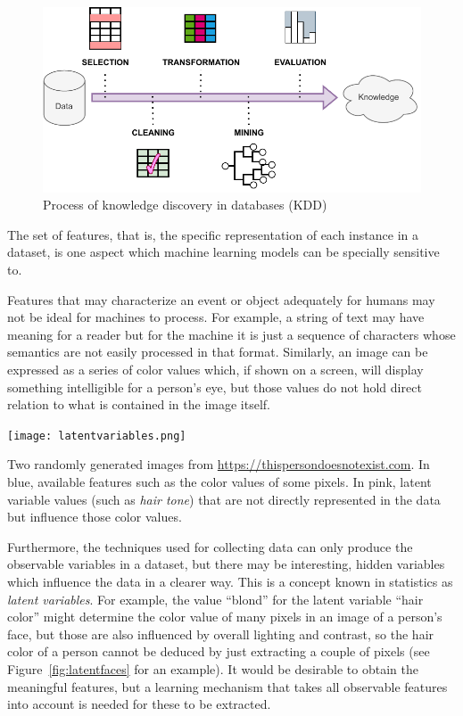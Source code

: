 \begin{figure}
    \includegraphics[width=\linewidth]{images/kddprocess.pdf}
    \caption{Process of knowledge discovery in databases (KDD)}
\end{figure}

The set of features, that is, the specific representation of each instance in a dataset, is one aspect which machine learning models can be specially sensitive to.


Features that may characterize an event or object adequately for humans may not be ideal for machines to process. For example, a string of text may have meaning for a reader but for the machine it is just a sequence of characters whose semantics are not easily processed in that format. Similarly, an image can be expressed as a series of color values which, if shown on a screen, will display something intelligible for a person's eye, but those values do not hold direct relation to what is contained in the image itself.

\begin{marginfigure}
\texttt{[image: latentvariables.png]}
\caption{\label{fig:latentfaces}Two randomly generated images from \url{https://thispersondoesnotexist.com}. In blue, available features such as the color values of some pixels. In pink, latent variable values (such as \textit{hair tone}) that are not directly represented in the data but influence those color values.}
\end{marginfigure}

Furthermore, the techniques used for collecting data can only produce the observable variables in a dataset, but there may be interesting, hidden variables which influence the data in a clearer way. This is a concept known in statistics as \textit{latent variables}. For example, the value  ``blond'' for the latent variable ``hair color'' might determine the color value of many pixels in an image of a person's face, but those are also influenced by overall lighting and contrast, so the hair color of a person cannot be deduced by just extracting a couple of pixels (see Figure~\ref{fig:latentfaces} for an example). It would be desirable to obtain the meaningful features, but a learning mechanism that takes all observable features into account is needed for these to be extracted.

